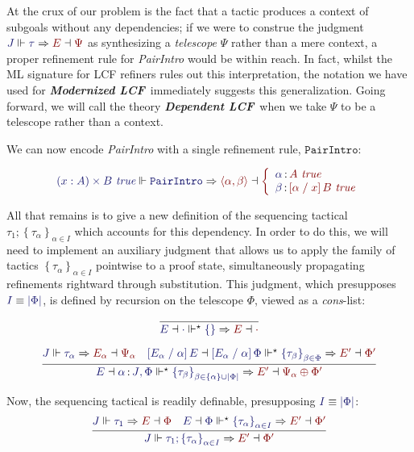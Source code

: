 \documentclass[11pt]{article}
\theoremstyle{definition}
\theoremstyle{remark}
\numberwithin{equation}{section}
\def\IModeColorName{MidnightBlue}
\def\OModeColorName{Maroon}
\newcommand\IMode[1]{{\color{\IModeColorName}{#1}}}
\newcommand\OMode[1]{{\color{\OModeColorName}{#1}}}
\newcommand\JJ{J}
\newcommand\MkSet[1]{\left\{#1\right\}}
\newcommand\MkFam[3]{\MkSet{#1_{#2}}_{#2\in #3}}
\newcommand\ISG[2]{\IMode{#1}\,{\color{Black}:}\,\IMode{#2}}
\newcommand\OSG[2]{\IMode{#1}\,{\color{Black}:}\,\OMode{#2}}
\newcommand\Refine[4]{\IMode{#1}\Vdash\IMode{#2}\Rightarrow\OMode{#4}\dashv\OMode{#3}}
\newcommand\ThenMultiAux[5]{%
  \IMode{#2}\dashv\IMode{#3}%
  \Vdash^\star\IMode{#1}\Rightarrow%
  \OMode{#4}\dashv\OMode{#5}%
}
\newcommand\IsTrueUnmoded[1]{#1\ \textit{true}}
\newcommand\ThenTac[2]{#1;#2}
\newcommand\DPairIntroRuleNullary{\mathtt{PairIntro}}
\newcommand\TyDPair[3]{(#2:#1) \times #3}
\newcommand\Tuple[1]{\left\langle#1\right\rangle}
\newcommand\Dom[1]{\left\vert#1\right\vert}
\newcommand\Subst[3]{\left[#1\;/\;#2\right]#3}
\newcommand\ModLCF{\textbf{\emph{Modernized LCF}}}
\newcommand\DepLCF{\textbf{\emph{Dependent LCF}}}
\newcommand\IsEquiv[2]{\IMode{#1}\equiv\IMode{#2}}
\begin{document}
At the crux of our problem is the fact that a tactic produces a context of subgoals
without any dependencies; if we were to construe the judgment
$\Refine{\JJ}{\tau}{\Psi}{E}$ as synthesizing a \emph{telescope} $\Psi$ rather
than a mere context, a proper refinement rule for \emph{PairIntro} would be
within reach. In fact, whilst the ML signature for LCF refiners rules out this
interpretation, the notation we have used for \ModLCF\ immediately suggests
this generalization. Going forward, we will call the theory \DepLCF\ when we
take $\Psi$ to be a telescope rather than a context.

We can now encode \emph{PairIntro} with a single refinement rule,
$\DPairIntroRuleNullary$:

\[
  \Refine{\IsTrueUnmoded{\TyDPair{A}{x}{B}}}{\DPairIntroRuleNullary}{%
    \left\{\begin{array}{l}
        \OSG{\alpha}{\IsTrueUnmoded{A}}\\
        \OSG{\beta}{\IsTrueUnmoded{\Subst{\alpha}{x}{B}}}
    \end{array}\right.
  }{
    \Tuple{\alpha,\beta}
  }
\]

All that remains is to give a new definition of the sequencing tactical
$\ThenTac{\tau_1}{\MkFam{\tau}{\alpha}{I}}$ which accounts for this dependency.
In order to do this, we will need to implement an auxiliary judgment
\framebox{$\ThenMultiAux{\MkFam{\tau}{\alpha}{I}}{E}{\Phi}{E'}{\Phi'}$} that
allows us to apply the family of tactics $\MkFam{\tau}{\alpha}{I}$ pointwise to
a proof state, simultaneously propagating refinements rightward through
substitution. This judgment, which presupposes $\IsEquiv{I}{\Dom\Phi}$, is defined
by recursion on the telescope $\Phi$, viewed as a \emph{cons}-list:

\begin{gather*}
  \infer{
    \ThenMultiAux{\MkSet{}}{E}{\cdot}{E}{\cdot}
  }{
  }\\[6pt]
  \infer{
    \ThenMultiAux{
      \MkFam{\tau}{\beta}{\MkSet{\alpha}\cup\Dom\Phi}
    }{E}{
      \ISG{\alpha}{\JJ},\Phi
    }{E'}{
      \Psi_\alpha\oplus\Phi'
    }
  }{
    \Refine{\JJ}{\tau_\alpha}{\Psi_\alpha}{E_\alpha} &
    \ThenMultiAux{
      \MkFam{\tau}{\beta}{\Phi}
    }{
      \Subst{E_\alpha}{\alpha}{E}%
    }{
      \Subst{E_\alpha}{\alpha}{\Phi}
    }{E'}{\Phi'}
  }
\end{gather*}

Now, the sequencing tactical is readily definable, presupposing $\IsEquiv{I}{\Dom\Phi}$:
\[
  \infer{
    \Refine{\JJ}{\ThenTac{\tau_1}{\MkFam{\tau}{\alpha}{I}}}{\Phi'}{E'}
  }{
    \Refine{\JJ}{\tau_1}{\Phi}{E} &
    \ThenMultiAux{
      \MkFam{\tau}{\alpha}{I}
    }{E}{\Phi}{E'}{\Phi'}
  }
\]
\end{document}
